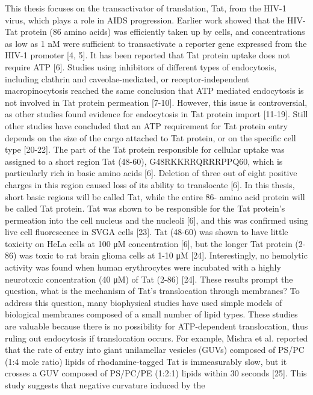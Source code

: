 This thesis focuses on 
the transactivator of translation, Tat, from the HIV-1 virus, which plays a 
role in AIDS progression. Earlier work showed that the HIV-Tat 
protein (86 amino acids) was efficiently taken up by cells, and concentrations 
as low as 1 nM were sufficient to transactivate a reporter gene expressed from 
the HIV-1 promoter [4, 5]. It has been reported that Tat protein uptake does not 
require ATP [6]. Studies using inhibitors of different types of endocytosis, 
including clathrin and caveolae-mediated, or receptor-independent 
macropinocytosis reached the same conclusion that ATP mediated endocytosis is 
not involved in Tat protein permeation [7-10]. However, this issue is 
controversial, as other studies found evidence for endocytosis in Tat protein 
import [11-19]. Still other studies have concluded that an ATP requirement for 
Tat protein entry depends on the size of the cargo attached to Tat protein, or 
on the specific cell type [20-22]. The part of the Tat protein responsible for 
cellular uptake was assigned to a short region Tat (48-60), G48RKKRRQRRRPPQ60, 
which is particularly rich in basic amino acids [6]. Deletion of three out of 
eight positive charges in this region caused loss of its ability to translocate 
[6]. In this thesis, short basic regions will be called Tat, while the 
entire 86-
amino acid protein will be called Tat protein. Tat was shown to be responsible 
for the Tat
protein’s permeation into the cell nucleus and the nucleoli [6], and this was 
confirmed using live
cell fluorescence in SVGA cells [23]. Tat (48-60) was shown to have little 
toxicity on HeLa
cells at 100 μM concentration [6], but the longer Tat protein (2-86) was toxic 
to rat brain glioma
cells at 1-10 μM [24]. Interestingly, no hemolytic activity was found when 
human erythrocytes
were incubated with a highly neurotoxic concentration (40 μM) of Tat (2-86) 
[24]. These results
prompt the question, what is the mechanism of Tat’s translocation through 
membranes?
To address this question, many biophysical studies have used simple models of
biological membranes composed of a small number of lipid types. These studies 
are valuable
because there is no possibility for ATP-dependent translocation, thus ruling 
out endocytosis if
translocation occurs. For example, Mishra et al. reported that the rate of 
entry into giant
unilamellar vesicles (GUVs) composed of PS/PC (1:4 mole ratio) lipids of 
rhodamine-tagged Tat
is immeasurably slow, but it crosses a GUV composed of PS/PC/PE (1:2:1) lipids 
within 30
seconds [25]. This study suggests that negative curvature induced by the 
